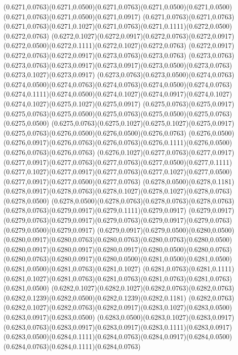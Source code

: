 (0.6271,0.0763)(0.6271,0.0500)(0.6271,0.0763)(0.6271,0.0500)(0.6271,0.0500)(0.6271,0.0763)(0.6271,0.0500)(0.6271,0.0917)
(0.6271,0.0763)(0.6271,0.0763)(0.6271,0.0763)(0.6271,0.1027)(0.6271,0.0763)(0.6271,0.1111)(0.6272,0.0500)(0.6272,0.0763)
(0.6272,0.1027)(0.6272,0.0917)(0.6272,0.0763)(0.6272,0.0917)(0.6272,0.0500)(0.6272,0.1111)(0.6272,0.1027)(0.6272,0.0763)
(0.6272,0.0917)(0.6272,0.0763)(0.6272,0.0917)(0.6273,0.0763)(0.6273,0.0763)
\PST@Solid(0.6273,0.0763)(0.6273,0.0763)(0.6273,0.0917)(0.6273,0.0917)(0.6273,0.0500)(0.6273,0.0763)(0.6273,0.1027)(0.6273,0.0917)
(0.6273,0.0763)(0.6273,0.0500)(0.6274,0.0763)(0.6274,0.0500)(0.6274,0.0763)(0.6274,0.0763)(0.6274,0.0500)(0.6274,0.0763)
(0.6274,0.1111)(0.6274,0.0500)(0.6274,0.1027)(0.6274,0.0917)(0.6274,0.1027)(0.6274,0.1027)(0.6275,0.1027)(0.6275,0.0917)
(0.6275,0.0763)(0.6275,0.0917)(0.6275,0.0763)(0.6275,0.0500)(0.6275,0.0763)(0.6275,0.0500)(0.6275,0.0763)(0.6275,0.0500)
(0.6275,0.0763)(0.6275,0.1027)(0.6275,0.1027)(0.6275,0.0917)(0.6275,0.0763)(0.6276,0.0500)(0.6276,0.0500)(0.6276,0.0763)
(0.6276,0.0500)(0.6276,0.0917)(0.6276,0.0763)(0.6276,0.0763)(0.6276,0.1111)(0.6276,0.0500)(0.6276,0.0763)(0.6276,0.0763)
(0.6276,0.1027)(0.6277,0.0763)(0.6277,0.0917)(0.6277,0.0917)(0.6277,0.0763)(0.6277,0.0763)(0.6277,0.0500)(0.6277,0.1111)
(0.6277,0.1027)(0.6277,0.0917)(0.6277,0.0763)(0.6277,0.1027)(0.6277,0.0500)(0.6277,0.0917)(0.6277,0.0500)(0.6277,0.0763)
(0.6278,0.0500)(0.6278,0.1181)(0.6278,0.0917)(0.6278,0.0763)(0.6278,0.1027)(0.6278,0.1027)(0.6278,0.0763)(0.6278,0.0500)
(0.6278,0.0500)(0.6278,0.0763)(0.6278,0.0763)(0.6278,0.0763)(0.6278,0.0763)(0.6279,0.0917)(0.6279,0.1111)(0.6279,0.0917)
(0.6279,0.0917)(0.6279,0.0763)(0.6279,0.0917)(0.6279,0.0763)(0.6279,0.0917)(0.6279,0.0763)(0.6279,0.0500)(0.6279,0.0917)
(0.6279,0.0917)(0.6279,0.0500)(0.6280,0.0500)(0.6280,0.0917)(0.6280,0.0763)(0.6280,0.0763)(0.6280,0.0763)(0.6280,0.0500)
(0.6280,0.0917)(0.6280,0.0917)(0.6280,0.0917)(0.6280,0.0500)(0.6280,0.0763)
\PST@Solid(0.6280,0.0763)(0.6280,0.0917)(0.6280,0.0500)(0.6281,0.0500)(0.6281,0.0500)(0.6281,0.0500)(0.6281,0.0763)(0.6281,0.1027)
(0.6281,0.0763)(0.6281,0.1111)(0.6281,0.1027)(0.6281,0.0763)(0.6281,0.0763)(0.6281,0.0763)(0.6281,0.0763)(0.6281,0.0500)
(0.6282,0.1027)(0.6282,0.1027)(0.6282,0.0763)(0.6282,0.0763)(0.6282,0.1239)(0.6282,0.0500)(0.6282,0.1239)(0.6282,0.1181)
(0.6282,0.0763)(0.6282,0.1027)(0.6282,0.0763)(0.6282,0.0917)(0.6283,0.1027)(0.6283,0.0500)(0.6283,0.0917)(0.6283,0.0500)
(0.6283,0.0500)(0.6283,0.1027)(0.6283,0.0917)(0.6283,0.0763)(0.6283,0.0917)(0.6283,0.0917)(0.6283,0.1111)(0.6283,0.0917)
(0.6283,0.0500)(0.6284,0.1111)(0.6284,0.0763)(0.6284,0.0917)(0.6284,0.0500)(0.6284,0.0763)(0.6284,0.1111)(0.6284,0.0763)
